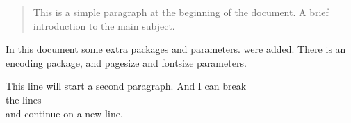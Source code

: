 \documentclass[12pt, letterpaper, twoside]{article}
\begin{document}
\begin{abstract}
This is a simple paragraph at the beginning of the document. A brief introduction to the main subject.
\end{abstract}

In this document some extra packages and parameters.
were added. There is an encoding package,
and pagesize and fontsize parameters.

This line will start a second paragraph. And I can
 break\\ the lines \\ and continue on a new line.
\end{document}
